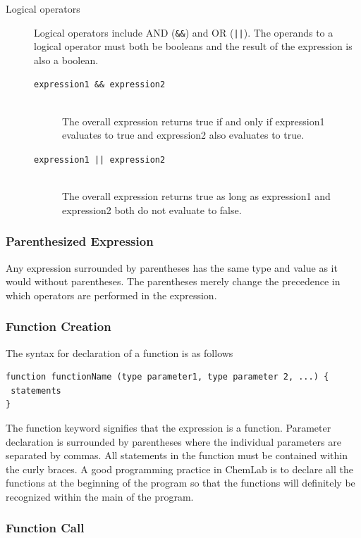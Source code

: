 \documentclass[11pt]{report}
\begin{document}
\begin{description}
\item[Logical operators]
Logical operators include AND (\texttt{\&\&}) and OR (\texttt{||}). The operands to a logical operator must both be booleans and the result of the expression is also a boolean.
	\begin{description}
		\item[\texttt{expression1 \&\& expression2}] \hfill \\ The overall expression returns true if and only if expression1 evaluates to true and expression2 also evaluates to true. 
		\item[\texttt{expression1 || expression2}] \hfill \\ The overall expression returns true as long as expression1 and expression2 both do not evaluate to false. 
	\end{description}
\end{description}

\subsubsection{Parenthesized Expression}
Any expression surrounded by parentheses has the same type and value as it would without parentheses. The parentheses merely change the precedence in which operators are performed in the expression. 

\subsubsection{Function Creation}
The syntax for declaration of a function is as follows

\begin{verbatim}
function functionName (type parameter1, type parameter 2, ...) {
 statements
}
\end{verbatim}

The function keyword signifies that the expression is a function. Parameter declaration is surrounded by parentheses where the individual parameters are separated by commas. All statements in the function must be contained within the curly braces. A good programming practice in ChemLab is to declare all the functions at the beginning of the program so that the functions will definitely be recognized within the main of the program.

\subsubsection{Function Call}
\end{document}
